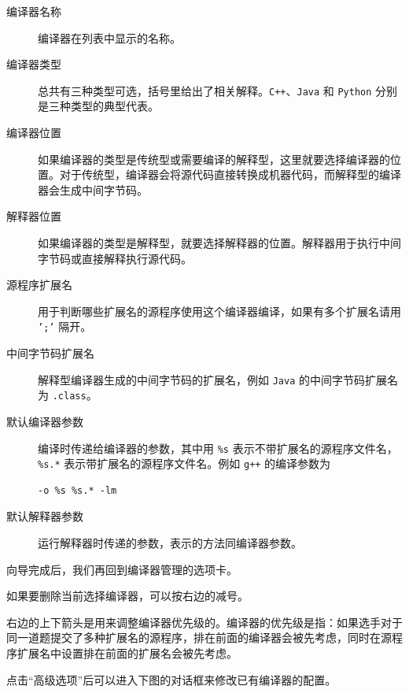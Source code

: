 \documentclass[UTF-8]{ctexart}
\begin{document}
				\begin{description}
					\item[编译器名称] 编译器在列表中显示的名称。
					\item[编译器类型] 总共有三种类型可选，括号里给出了相关解释。\texttt{C++}、\texttt{Java} 和 \texttt{Python} 分别是三种类型的典型代表。
					\item[编译器位置] 如果编译器的类型是传统型或需要编译的解释型，这里就要选择编译器的位置。对于传统型，编译器会将源代码直接转换成机器代码，而解释型的编译器会生成中间字节码。
					\item[解释器位置] 如果编译器的类型是解释型，就要选择解释器的位置。解释器用于执行中间字节码或直接解释执行源代码。
					\item[源程序扩展名] 用于判断哪些扩展名的源程序使用这个编译器编译，如果有多个扩展名请用 \texttt{';'} 隔开。
					\item[中间字节码扩展名] 解释型编译器生成的中间字节码的扩展名，例如 \texttt{Java} 的中间字节码扩展名为 \texttt{.class}。
					\item[默认编译器参数] 编译时传递给编译器的参数，其中用 \texttt{\%s} 表示不带扩展名的源程序文件名，\texttt{\%s.*} 表示带扩展名的源程序文件名。例如 \texttt{g++} 的编译参数为
					\begin{lstlisting}[frame=shadowbox,basicstyle=\ttfamily]
-o %s %s.* -lm
					\end{lstlisting}
					\item[默认解释器参数] 运行解释器时传递的参数，表示的方法同编译器参数。
				\end{description}
				
				向导完成后，我们再回到编译器管理的选项卡。
				
				如果要删除当前选择编译器，可以按右边的减号。
				
				右边的上下箭头是用来调整编译器优先级的。编译器的优先级是指：如果选手对于同一道题提交了多种扩展名的源程序，排在前面的编译器会被先考虑，同时在源程序扩展名中设置排在前面的扩展名会被先考虑。
				
				点击“高级选项”后可以进入下图的对话框来修改已有编译器的配置。
				
\end{document}
